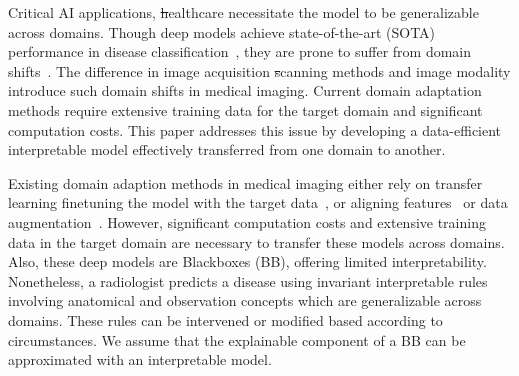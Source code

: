 






Critical AI applications, \st healthcare necessitate the model to be generalizable across domains. Though deep models achieve state-of-the-art (SOTA) performance in disease classification~\cite{irvin2019chexpert}, they are prone to suffer from domain shifts~\cite{guan2021domain}. The difference in image acquisition \st scanning methods and image modality introduce such domain shifts in medical imaging.
Current domain adaptation methods require extensive training data for the target domain and significant computation costs.
This paper addresses this issue by developing a data-efficient interpretable model effectively transferred from one domain to another.

Existing domain adaption methods in medical imaging either rely on transfer learning \ie finetuning the model with the target data~\cite{zhang2019unsupervised, swati2019brain, kaur2019improving, wang2017balanced, kumar2017cross}, or aligning features~\cite{karani2018lifelong, guan2020attention, gao2019decoding} or data augmentation~\cite{gholami2019novel}. However, significant computation costs and extensive training data in the target domain are necessary to transfer these models across domains. Also, these deep models are Blackboxes (BB), offering limited interpretability. Nonetheless, a radiologist predicts a disease using invariant interpretable rules involving anatomical and observation concepts which are generalizable across domains. These rules can be intervened or modified based according to circumstances. We assume that the explainable component of a BB can be approximated with an interpretable model.

